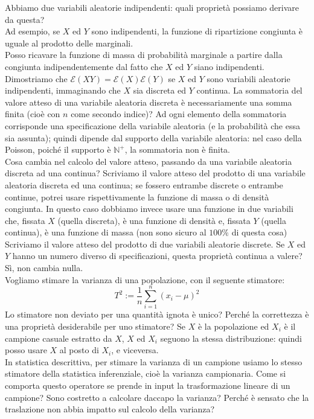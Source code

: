 \documentclass{article}
\begin{document}
    Abbiamo due variabili aleatorie indipendenti: quali proprietà possiamo derivare da questa? \\
    Ad esempio, se $ X $ ed $ Y $ sono indipendenti, la funzione di ripartizione congiunta è uguale al prodotto delle marginali. \\
    Posso ricavare la funzione di massa di probabilità marginale a partire dalla congiunta indipendentemente dal fatto che $ X $ ed $ Y $ siano indipendenti. \\
    Dimostriamo che $ \mathcal E ( XY ) = \mathcal E ( X ) \mathcal E ( Y ) $ se $ X $ ed $ Y $ sono variabili aleatorie indipendenti, immaginando che $ X $ sia discreta ed $ Y $
    continua. La sommatoria del valore atteso di una variabile aleatoria discreta è necessariamente una somma finita (cioè con $ n $ come secondo indice)? Ad ogni elemento della
    sommatoria corrisponde una specificazione della variabile aleatoria (e la probabilità che essa sia assunta); quindi dipende dal supporto della variabile aleatoria: nel caso
    della Poisson, poiché il supporto è $ \mathbb N^+ $, la sommatoria non è finita. \\
    Cosa cambia nel calcolo del valore atteso, passando da una variabile aleatoria discreta ad una continua? Scriviamo il valore atteso del prodotto di una variabile aleatoria
    discreta ed una continua; se fossero entrambe discrete o entrambe continue, potrei usare rispettivamente la funzione di massa o di densità congiunta. In questo caso dobbiamo
    invece usare una funzione in due variabili che, fissata $ X $ (quella discreta), è una funzione di densità e, fissata $ Y $ (quella continua), è una funzione di massa (non sono
    sicuro al $ 100\% $ di questa cosa) \\
    Scriviamo il valore atteso del prodotto di due variabili aleatorie discrete. Se $ X $ ed $ Y $ hanno un numero diverso di specificazioni, questa proprietà continua a valere? Sì, non
    cambia nulla. \\
    Vogliamo stimare la varianza di una popolazione, con il seguente stimatore:
    \[
        T^2 := \frac{ 1 }{ n } \sum_{ i = 1 }^n ( x_i - \mu )^2
    \]
    Lo stimatore non deviato per una quantità ignota è unico? Perché la correttezza è una proprietà desiderabile per uno stimatore? Se $ X $ è la popolazione ed $ X_i $ è il campione
    casuale estratto da $ X $, $ X $ ed $ X_i $ seguono la stessa distribuzione: quindi posso usare $ X $ al posto di $ X_i $, e viceversa. \\
    In statistica descrittiva, per stimare la varianza di un campione usiamo lo stesso stimatore della statistica inferenziale, cioè la varianza campionaria. Come si comporta
    questo operatore se prende in input la trasformazione lineare di un campione? Sono costretto a calcolare daccapo la varianza? Perché è sensato che la traslazione non abbia
    impatto sul calcolo della varianza? \\
    
\end{document}
